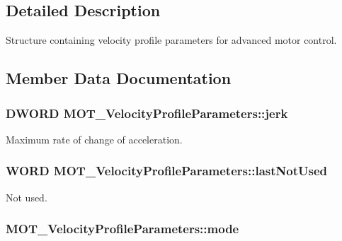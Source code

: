\subsection{Detailed Description}
Structure containing velocity profile parameters for advanced motor control. 



\subsection{Member Data Documentation}
\subsubsection[{\texorpdfstring{jerk}{jerk}}]{\setlength{\rightskip}{0pt plus 5cm}D\+W\+O\+RD M\+O\+T\+\_\+\+Velocity\+Profile\+Parameters\+::jerk}\hypertarget{struct_m_o_t___velocity_profile_parameters_a302ba9cec95692cd2ea22331b259a69e}{}\label{struct_m_o_t___velocity_profile_parameters_a302ba9cec95692cd2ea22331b259a69e}


Maximum rate of change of acceleration. 

\subsubsection[{\texorpdfstring{last\+Not\+Used}{lastNotUsed}}]{\setlength{\rightskip}{0pt plus 5cm}W\+O\+RD M\+O\+T\+\_\+\+Velocity\+Profile\+Parameters\+::last\+Not\+Used}\hypertarget{struct_m_o_t___velocity_profile_parameters_abe553e3d79b79259039b34ac2e5e7e75}{}\label{struct_m_o_t___velocity_profile_parameters_abe553e3d79b79259039b34ac2e5e7e75}


Not used. 

\subsubsection[{\texorpdfstring{mode}{mode}}]{ M\+O\+T\+\_\+\+Velocity\+Profile\+Parameters\+::mode}\hypertarget{struct_m_o_t___velocity_profile_parameters_a7afca60ad76895b0f67e17b97ad8bcb0}{}\label{struct_m_o_t___velocity_profile_parameters_a7afca60ad76895b0f67e17b97ad8bcb0}


